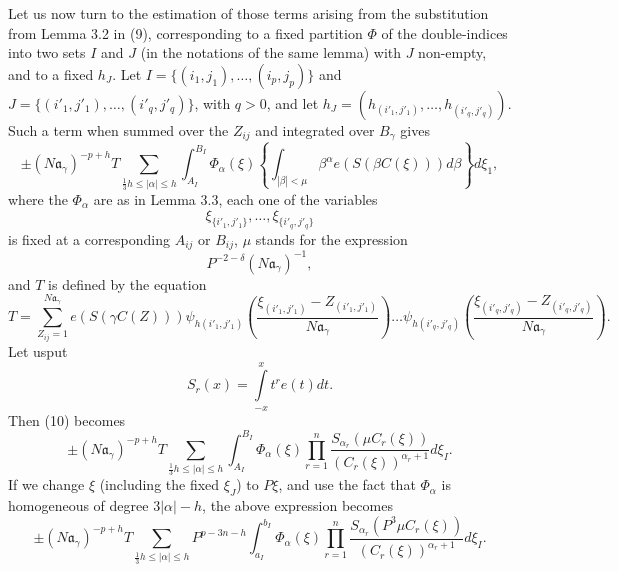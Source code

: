 Let us now turn to the estimation of those terms arising from the substitution from Lemma 3.2 in (9), corresponding to a fixed partition $\Phi$ of the double-indices into two sets $I$ and $J$ (in the notations of the same lemma) with $J$ non-empty, and to a fixed $h_J$. Let $I = \{(i_1, j_1),\ldots, (i_{p},j_p)\}$ and $J = \{(i'_1, j'_1), \ldots, (i'_q, j'_q)\}$, with $q >0$, and let  $h_J = (h_{(i'_1, j'_1)}, \ldots, h_{(i'_q, j'_q)})$. Such a term when summed over the $Z_{ij}$ and integrated over $B_\gamma$ gives 
\begin{equation*}
\pm (N\mathfrak{a}_\gamma)^{-p+h} T \sum\limits_{\frac{1}{3} h \leq |\alpha|\leq h} \int^{B_I}_{A_I} \Phi_\alpha (\xi) \left\{
\int_{|\beta|<\mu}  \beta^\alpha e (S (\beta C (\xi))) d \beta \right\} d \xi_1, \tag{10}
\end{equation*}
where the $\Phi_\alpha$ are as in Lemma 3.3, each one of the variables 
$$
\xi_{\{i'_1, j'_1\}}, \ldots, \xi_{\{i'_q, j'_q\}}
             $$ 
is fixed at a corresponding $A_{ij}$ or $B_{ij}$, $\mu$ stands for the expression 
$$
P^{-2-\delta} (N\mathfrak{a}_\gamma)^{-1},
$$ 
and $T$ is defined by the equation
{\fontsize{09}{11}\selectfont
$$
T = \sum\limits^{N\mathfrak{a}_\gamma}_{Z_{ij} =1} e (S(\gamma C (Z))) \psi_{h(i'_1, j'_1)} \left(\frac{\xi_{(i'_1, j'_1)} - Z_{(i'_1, j'_1)}}{N\mathfrak{a}_\gamma} \right) \ldots \psi_{h(i'_q, j'_q)} \left(\dfrac{\xi_{(i'_q, j'_q)} - Z_{(i'_q, j'_q)} }{N\mathfrak{a}_\gamma} \right).
$$}\relax
Let us\pageoriginale put 
$$
S_r (x) = \int\limits^{x}_{-x} t^r e (t) dt.
$$
Then (10) becomes 
$$
\pm (N\mathfrak{a}_\gamma)^{-p + h } T \sum\limits_{\frac{1}{3} h \leq |\alpha| \leq h } \int^{B_I}_{A_I} \Phi_\alpha (\xi) \prod\limits^n_{r=1} \dfrac{S_{\alpha_r} (\mu C_r (\xi))}{(C_r (\xi))^{\alpha_r + 1}} d \xi_I.
$$
If we change $\xi$ (including the fixed $\xi_J$) to $P\xi$, and use the fact that $\Phi_\alpha$ is homogeneous of degree $3|\alpha|-h$, the above expression becomes
$$
\pm (N\mathfrak{a}_\gamma)^{-p+h} T \sum\limits_{\frac{1}{3} h \leq |\alpha| \leq h} P^{p-3n-h} \int^{b_I}_{a_I} \Phi_\alpha (\xi) \prod\limits^n_{r=1} \dfrac{S_{\alpha_r} (P^3 \mu C_r (\xi))}{(C_r (\xi))^{\alpha_r + 1}} d \xi_I.
$$

